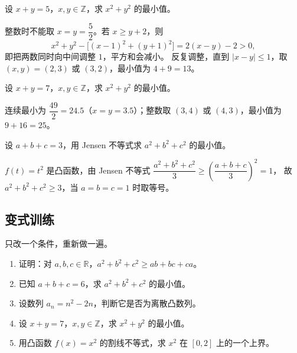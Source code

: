 \begin{explore}
\begin{example}
设 $x+y=5$，$x,y\in\mathbb{Z}$，求 $x^2+y^2$ 的最小值。
\end{example}
\begin{solution}
整数时不能取 $x=y=\dfrac52$。若 $x\geq y+2$，则
\[
  x^2+y^2-\big[(x-1)^2+(y+1)^2\big]=2(x-y)-2>0,
\]
即把两数同时向中间调整 $1$，平方和会减小。
反复调整，直到 $|x-y|\leq1$，取 $(x,y)=(2,3)$ 或 $(3,2)$，最小值为 $4+9=13$。
\end{solution}

\begin{problem}
设 $x+y=7$，$x,y\in\mathbb{Z}$，求 $x^2+y^2$ 的最小值。
\end{problem}
\begin{solution}
连续最小为 $\dfrac{49}{2}=24.5$（$x=y=3.5$）；整数取 $(3,4)$ 或 $(4,3)$，最小值为 $9+16=25$。
\end{solution}

\begin{problem}
设 $a+b+c=3$，用 Jensen 不等式求 $a^2+b^2+c^2$ 的最小值。
\end{problem}
\begin{solution}
$f(t)=t^2$ 是凸函数，由 Jensen 不等式
$\dfrac{a^2+b^2+c^2}{3}\geq\left(\dfrac{a+b+c}{3}\right)^2=1$，
故 $a^2+b^2+c^2\geq3$，当 $a=b=c=1$ 时取等号。
\end{solution}
\end{explore}

\begin{inclasstest}
\subsection{变式训练}
只改一个条件，重新做一遍。
\begin{enumerate}
  \item 证明：对 $a,b,c\in\mathbb{R}$，$a^2+b^2+c^2\geq ab+bc+ca$。
  \item 已知 $a+b+c=6$，求 $a^2+b^2+c^2$ 的最小值。
  \item 设数列 $a_n=n^2-2n$，判断它是否为离散凸数列。
  \item 设 $x+y=7$，$x,y\in\mathbb{Z}$，求 $x^2+y^2$ 的最小值。
  \item 用凸函数 $f(x)=x^2$ 的割线不等式，求 $x^2$ 在 $[0,2]$ 上的一个上界。
\end{enumerate}
\end{inclasstest}

